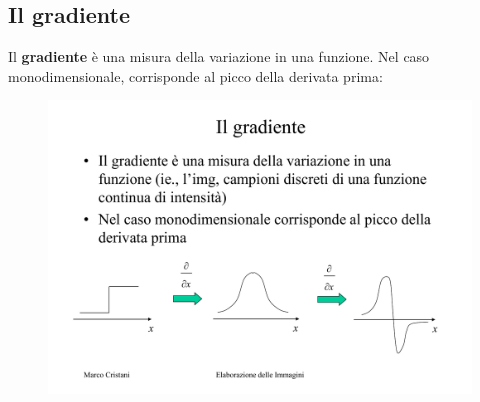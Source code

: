 \documentclass[a4paper]{article}
\begin{document}
	\subsection{Il gradiente}
	
	Il \textcolor{Red3}{\textbf{gradiente}} è una misura della variazione in una funzione. Nel caso monodimensionale, corrisponde al picco della derivata prima:
	\begin{figure}[!htp]
		\centering
		\includegraphics[width=\textwidth]{img/gradiente.pdf}
	\end{figure}
	
\end{document}
